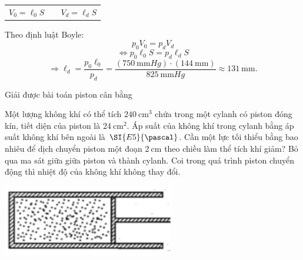\begin{vd}
{\begin{enumerate}[label=\alph*)]
\begin{minipage}[l]{0.75\textwidth}
\begin{center}
\begin{tabular}{C{4cm} C{1.5cm} C{4.5cm}}
							$V_0=\ell_0S$ & & $V_d=\ell_d S$
						\end{tabular}
					\end{center}
					Theo định luật Boyle:
					$$p_0V_0=p_dV_d$$
					$$\Leftrightarrow p_0\ell_0S=p_d\ell_dS$$
					$$\Rightarrow \ell_d=\dfrac{p_0\ell_0}{p_d}=\dfrac{\left(\SI{750}{\milli\meter Hg}\right)\cdot\left(\SI{144}{\milli\meter}\right)}{\SI{825}{\milli\meter Hg}}\approx\SI{131}{\milli\meter}.$$
				\end{minipage}
			\end{enumerate}
	}
\end{vd}
\begin{dang}{Giải được bài toán piston cân bằng}
	\end{dang}
\begin{vd}
	Một lượng không khí có thể tích $\SI{240}{\centi\meter^3}$ chứa trong một cylanh có piston đóng kín, tiết diện của piston là $\SI{24}{\centi\meter^2}$. Áp suất của không khí trong cylanh bằng áp suất không khí bên ngoài là $\SI{E5}{\pascal}$. Cần một lực tối thiểu bằng bao nhiêu để dịch chuyển piston một đoạn $\SI{2}{\centi\meter}$ theo chiều làm thể tích khí giảm? Bỏ qua ma sát giữa giữa piston và thành cylanh. Coi trong quá trình piston chuyển động thì nhiệt độ của không khí không thay đổi.
	\begin{center}
		\includegraphics[width=0.25\linewidth]{figs/VN12-Y24-PH-SYL-010-8}
	\end{center}
\end{vd}
